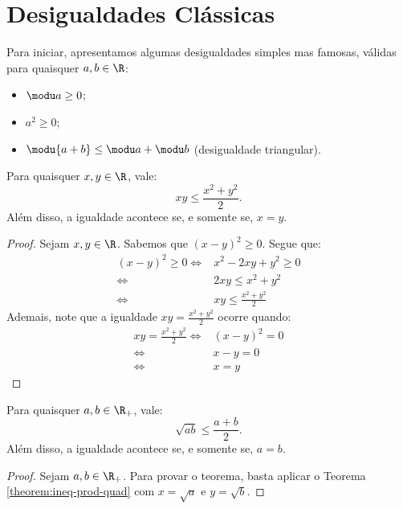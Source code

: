 \section{Desigualdades Clássicas}

Para iniciar, apresentamos algumas desigualdades simples mas famosas, válidas para quaisquer $a,b \in \R$:
\begin{itemize}
  \item $\modu a \ge 0$;
  \item $a^2 \ge 0$;
  \item $\modu {a+b} \le \modu a + \modu b$ (desigualdade triangular).
\end{itemize}

\begin{theorem}
\label{theorem:ineq-prod-quad}
Para quaisquer $x, y \in \R$, vale:
%
\begin{equation*}
    xy \le \frac {x^2 +y^2} 2.
\end{equation*}
%
Além disso, a igualdade acontece se, e somente se, $x=y$.
\end{theorem}

\begin{proof}
Sejam $x, y \in \R$. Sabemos que $(x-y)^2 \ge 0$. Segue que:
%
\begin{align*}
	(x-y)^2 \ge 0 \iff & x^2 - 2xy + y^2 \ge 0 \\
				  \iff & 2xy \le x^2 + y^2 \\
				  \iff & xy \le \frac {x^2 + y^2} 2
\end{align*}
%
Ademais, note que a igualdade $xy = \frac {x^2 + y^2} 2$ ocorre quando:
%
\begin{align*}
	xy = \frac {x^2 + y^2} 2 \iff & (x-y)^2 = 0 \\
							 \iff & x-y = 0 \\
							 \iff & x = y
\end{align*}
\end{proof}

\begin{theorem}
\label{theo:desigualdade-medias-dois-termos}
Para quaisquer $a, b \in \R_+$, vale:
%
\begin{equation*}
    \sqrt{ab} \leq \frac {a +b} 2.
\end{equation*}
Além disso, a igualdade acontece se, e somente se, $a=b$.
\end{theorem}

\begin{proof}
Sejam $a, b \in \R_+$. Para provar o teorema, basta aplicar o Teorema \ref{theorem:ineq-prod-quad} com $x = \sqrt a$ e $y = \sqrt b$.
\end{proof}

